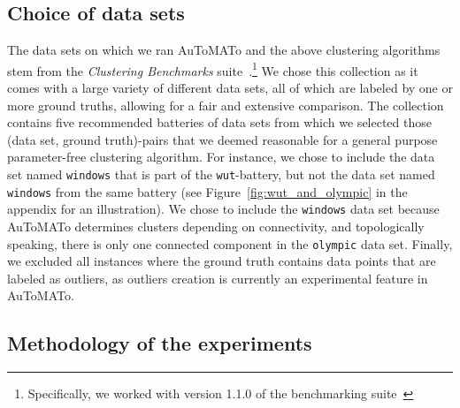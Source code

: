 \documentclass[10pt]{article} %
\theoremstyle{plain}
\newcommand{\aut}{AuToMATo\xspace}
\begin{document}
\subsection{Choice of data sets}\label{subsec:choice_of_data_sets_for_comparison}
The data sets on which we ran \aut and the above clustering algorithms stem from the \emph{Clustering Benchmarks} suite~\citep{gagolewski_benchmarking_suite}.\footnote{Specifically, we worked with version 1.1.0 of the benchmarking suite~\citep{gagolewski_benchmarking_suite_release}}
We chose this collection as it comes with a large variety of different data sets, all of which are labeled by one or more ground truths, allowing for a fair and extensive comparison. The collection contains five recommended batteries of data sets from which we selected those (data set, ground truth)-pairs that we deemed reasonable for a general purpose parameter-free clustering algorithm.
For instance, we chose to include the data set named \texttt{windows} that is part of the \texttt{wut}-battery, but not the data set named \texttt{windows} from the same battery (see Figure~\ref{fig:wut_and_olympic} in the appendix for an illustration).
We chose to include the \texttt{windows} data set because \aut determines clusters depending on connectivity, and topologically speaking, there is only one connected component in the \texttt{olympic} data set.
Finally, we excluded all instances where the ground truth contains data points that are labeled as outliers, as outliers creation is currently an experimental feature in \aut.

\subsection{Methodology of the experiments}\label{subsec:methodology_of_experiments}
\end{document}
